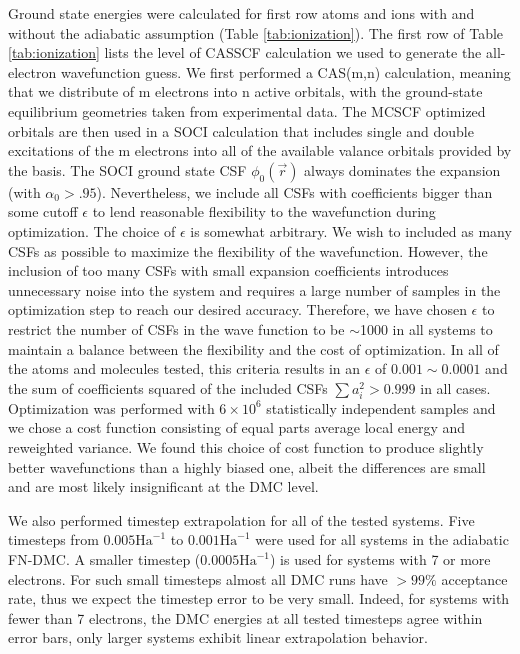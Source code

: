 \documentclass[aps,prl,superscriptaddress,groupedaddress]{revtex4}
\begin{document}
Ground state energies were calculated for first row atoms and ions with and without the adiabatic assumption (Table \ref{tab:ionization}). The first row of Table \ref{tab:ionization} lists the level of CASSCF calculation we used to generate the all-electron wavefunction guess. We first performed a CAS(m,n) calculation, meaning that we distribute of m electrons into n active orbitals, with the ground-state equilibrium geometries taken from experimental data\cite{CCCBDB}. The MCSCF optimized orbitals are then used in a SOCI calculation that includes single and double excitations of the m electrons into all of the available valance orbitals provided by the basis. The SOCI ground state CSF $\phi_0(\vec{r})$ always dominates the expansion (with $\alpha_0>.95$). Nevertheless, we include all CSFs with coefficients bigger than some cutoff $\epsilon$ to lend reasonable flexibility to the wavefunction during optimization. The choice of $\epsilon$ is somewhat arbitrary. We wish to included as many CSFs as possible to maximize the flexibility of the wavefunction. However, the inclusion of too many CSFs with small expansion coefficients introduces unnecessary noise into the system and requires a large number of samples in the optimization step to reach our desired accuracy. Therefore, we have chosen $\epsilon$ to restrict the number of CSFs in the wave function to be $\sim$1000 in all systems to maintain a balance between the flexibility and the cost of optimization. In all of the atoms and molecules tested, this criteria results in an $\epsilon$ of $0.001\sim0.0001$ and the sum of coefficients squared of the included CSFs $\sum a_i^2 > 0.999$ in all cases. Optimization was performed with $6\times10^6$ statistically independent samples and we chose a cost function consisting of equal parts average local energy and reweighted variance. We found this choice of cost function to produce slightly better wavefunctions than a highly biased one, albeit the differences are small and are most likely insignificant at the DMC level. 

We also performed timestep extrapolation for all of the tested systems. Five timesteps from $0.005\text{Ha}^{-1}$ to $0.001\text{Ha}^{-1}$ were used for all systems in the adiabatic FN-DMC. A smaller timestep ($0.0005\text{Ha}^{-1}$) is used for systems with 7 or more electrons. For such small timesteps almost all DMC runs have $>99\%$ acceptance rate, thus we expect the timestep error to be very small. Indeed, for systems with fewer than 7 electrons, the DMC energies at all tested timesteps agree within error bars, only larger systems exhibit linear extrapolation behavior.
\end{document}
